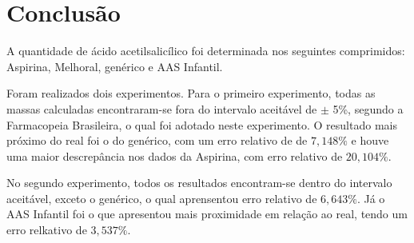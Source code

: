 \chapter{Conclusão}

A quantidade de ácido acetilsalicílico foi determinada nos seguintes comprimidos: Aspirina\R, 
Melhoral, genérico e AAS Infantil.

Foram realizados dois experimentos. Para o primeiro experimento, todas as massas calculadas
encontraram-se fora do intervalo aceitável de $\pm$ 5\%, segundo a Farmacopeia Brasileira, o qual
foi adotado neste experimento. O resultado mais próximo do real foi o do genérico, com um erro
relativo de de $7,148\%$ e houve uma maior descrepância nos dados da Aspirina\R, com erro relativo
de $20,104\%$.

No segundo experimento, todos os resultados encontram-se dentro do intervalo aceitável, exceto o
genérico, o qual aprensentou erro relativo de $6,643\%$. Já o AAS Infantil foi o que apresentou mais
proximidade em relação ao real, tendo um erro relkativo de $3,537\%$.
